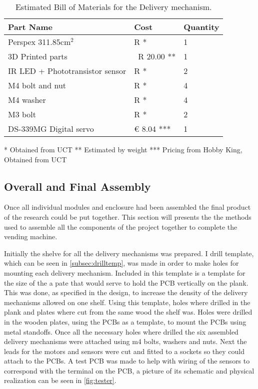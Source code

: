 \documentclass[a4paper,11pt]{article}
\numberwithin{figure}{section}
\numberwithin{table}{section}
\begin{document}
	\begin{table}[ht]
	\centering		
	\begin{tabular}{| m{8cm} | m{4cm}| m{3cm} |}
	\hline
	\textbf{Part Name} & \textbf{Cost} & \textbf{Quantity} \\
	\hline
	Perspex 311.85cm$^2$ & R * & 1 \\
	\hline
	3D Printed parts & ~R 20.00 ** & 1 \\
	\hline
	IR LED + Phototransistor sensor & R * & 2 \\
	\hline
	M4 bolt and nut & R * & 4 \\
	\hline 
	M4 washer & R * & 4 \\
	\hline	
	M3 bolt & R * & 2 \\
	\hline
	DS-339MG Digital servo & \euro{} 8.04 *** & 1 \\
	\hline
	\end{tabular}
	
	 * Obtained from UCT
	 ** Estimated by weight
	 *** Pricing from Hobby King, Obtained from UCT
	\caption{Estimated Bill of Materials for the Delivery mechanism. \label{tab:bomdel}}
	\end{table}	

\subsection{Overall and Final Assembly}
Once all individual modules and enclosure had been assembled the final product of the research could be put together. This section will presents the the methods used to assemble all the components of the project together to complete the vending machine.

Initially the shelve for all the delivery mechanisms was prepared. I drill template, which can be seen in \autoref{subsec:drilltemp}, was made in order to make holes for mounting each delivery mechanism. Included in this template is a template for the size of the a pate that would serve to hold the PCB vertically on the plank. This was done, as specified in the design, to increase the density of the delivery mechanisms allowed on one shelf. Using this template, holes where drilled in the plank and plates where cut from the same wood the shelf was. Holes were drilled in the wooden plates, using the PCBs as a template, to mount the PCBs using metal standoffs. Once all the necessary holes where drilled the six assembled delivery mechanisms were attached using m4 bolts, washers and nuts. Next the leads for the motors and sensors were cut and fitted to a sockets so they could attach to the PCBs. A test PCB was made to help with wiring of the sensors to correspond with the terminal on the PCB, a picture of its schematic and physical realization can be seen in \autoref{fig:tester}.
\end{document}
